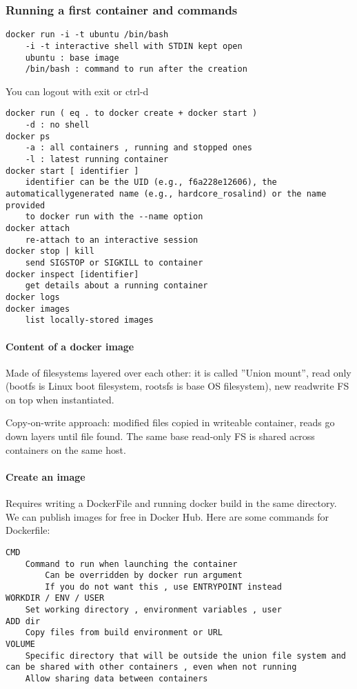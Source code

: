 \subsubsection{Running a first container and commands}

\begin{verbatim}
docker run -i -t ubuntu /bin/bash
    -i -t interactive shell with STDIN kept open
    ubuntu : base image
    /bin/bash : command to run after the creation
\end{verbatim}

You can logout with exit or ctrl-d
\begin{verbatim}
docker run ( eq . to docker create + docker start )
    -d : no shell
docker ps
    -a : all containers , running and stopped ones
    -l : latest running container
docker start [ identifier ]
    identifier can be the UID (e.g., f6a228e12606), the automaticallygenerated name (e.g., hardcore_rosalind) or the name provided
    to docker run with the --name option
docker attach
    re-attach to an interactive session
docker stop | kill
    send SIGSTOP or SIGKILL to container
docker inspect [identifier]
    get details about a running container
docker logs
docker images
    list locally-stored images
\end{verbatim}

\paragraph{Content of a docker image}
Made of filesystems layered over each other: it is called ”Union mount”, read only (bootfs is Linux boot filesystem, rootsfs is base OS filesystem), new readwrite FS on top when instantiated.

Copy-on-write approach: modified files copied in writeable container, reads go down layers until file found. The same base read-only FS is shared across containers on the same host.

\paragraph{Create an image}
Requires writing a DockerFile and running docker build in the same directory. We can publish images for free in Docker Hub. Here are some commands for Dockerfile:
\begin{verbatim}
CMD
    Command to run when launching the container
        Can be overridden by docker run argument
        If you do not want this , use ENTRYPOINT instead
WORKDIR / ENV / USER
    Set working directory , environment variables , user
ADD dir
    Copy files from build environment or URL
VOLUME
    Specific directory that will be outside the union file system and can be shared with other containers , even when not running
    Allow sharing data between containers
\end{verbatim}

